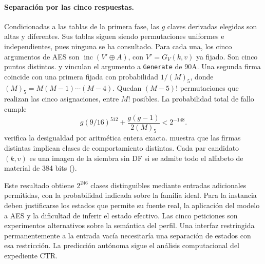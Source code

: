 \paragraph{Separación por las cinco respuestas.}
Condicionadas a las tablas de la primera fase, las \(g\) claves derivadas
elegidas son altas y diferentes. Sus tablas siguen siendo permutaciones
uniformes e independientes, pues ninguna se ha consultado. Para cada una,
los cinco argumentos de AES son \(\operatorname{inc}(V'\oplus A)\),
con \(V'=G_V(k,v)\) ya fijado. Son cinco puntos distintos.
y  vinculan el argumento
a \texttt{Generate} de 90A. Una segunda firma coincide con una primera
fijada con probabilidad \(1/(M)_5\), donde \((M)_5=M(M-1)\cdots(M-4)\). Quedan \((M-5)!\) permutaciones que realizan las cinco asignaciones,
entre \(M!\) posibles. La probabilidad total de fallo cumple
\[
    g(9/16)^{512}+\frac{g(g-1)}{2(M)_5}<2^{-148}.
\]
 verifica la desigualdad por
aritmética entera exacta.
 muestra que las firmas
distintas implican clases de comportamiento distintas. Cada par candidato
\((k,v)\) es una imagen de la siembra sin DF si se admite todo el alfabeto
de material de 384 bits
().

Este resultado obtiene \(2^{246}\) clases distinguibles mediante entradas
adicionales permitidas, con la probabilidad indicada sobre la familia
ideal. Para la instancia deben justificarse los estados que permite su
fuente real, la aplicación del modelo a AES y la dificultad de inferir
el estado efectivo. Las cinco peticiones son experimentos alternativos
sobre la semántica del perfil. Una interfaz restringida permanentemente
a la entrada vacía necesitaría una separación de estados con esa restricción.
La predicción autónoma sigue el análisis computacional del expediente CTR.
